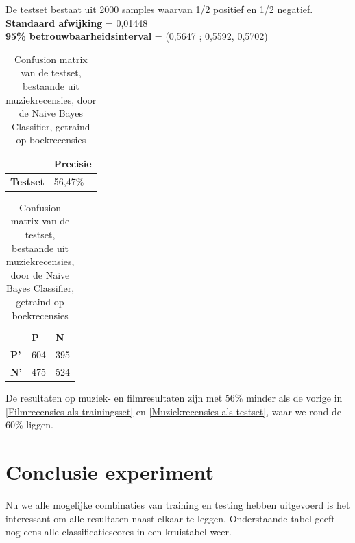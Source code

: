 De testset bestaat uit 2000 samples waarvan 1/2 positief en 1/2 negatief.
\newline
\textbf{Standaard afwijking} = 0,01448\\
\textbf{95\% betrouwbaarheidsinterval} = (0,5647 ; 0,5592, 0,5702)\\
\newpage
\begin{table}[h]
\centering
\setlength\tabcolsep{4pt}
\begin{minipage}{0.48\textwidth}
\centering
\begin{tabular}{l|l|}
\cline{2-2}
                                            & \textbf{Precisie} \\ \hline
\multicolumn{1}{|l|}{\textbf{Testset}}      & 56,47\%           \\ \hline
\end{tabular}
\caption{Classificatieprecisie Naive Bayes Classifier, getraind op boekrecensies, getest op muziekrecensies}
\end{minipage}%
\hfill
\begin{minipage}{0.48\textwidth}
\centering
\begin{tabular}{lll}
                                 & \textbf{P}               & \textbf{N}               \\ \cline{2-3} 
\multicolumn{1}{l|}{\textbf{P'}} & \multicolumn{1}{l|}{604} & \multicolumn{1}{l|}{395} \\ \cline{2-3} 
\multicolumn{1}{l|}{\textbf{N'}} & \multicolumn{1}{l|}{475} & \multicolumn{1}{l|}{524} \\ \cline{2-3} 
\end{tabular}
\caption{Confusion matrix van de testset, bestaande uit muziekrecensies, door de  Naive Bayes Classifier, getraind op boekrecensies} 
\end{minipage}
\end{table}


De resultaten op muziek- en filmresultaten zijn met 56\% minder als de vorige in \ref{Filmrecensies als trainingsset} en \ref{Muziekrecensies als testset}, waar we rond de 60\% liggen.

\section{Conclusie experiment}\label{Conclusie experiment}

Nu we alle mogelijke combinaties van training en testing hebben uitgevoerd is het interessant om alle resultaten naast elkaar te leggen. Onderstaande tabel geeft nog eens alle classificatiescores in een kruistabel weer.

